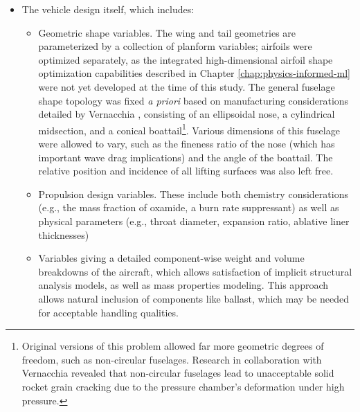 \begin{example}
\begin{itemize}
\begin{itemize}
            \item The vehicle design itself, which includes:
            \begin{itemize}
                \item Geometric shape variables. The wing and tail geometries are parameterized by a collection of planform variables; airfoils were optimized separately, as the integrated high-dimensional airfoil shape optimization capabilities described in Chapter \ref{chap:physics-informed-ml} were not yet developed at the time of this study. The general fuselage shape topology was fixed \emph{a priori} based on manufacturing considerations detailed by Vernacchia \cite{vernacchia_development_2020}, consisting of an ellipsoidal nose, a cylindrical midsection, and a conical boattail\footnote{Original versions of this problem allowed far more geometric degrees of freedom, such as non-circular fuselages. Research in collaboration with Vernacchia \cite{vernacchia_development_2020} revealed that non-circular fuselages lead to unacceptable solid rocket grain cracking due to the pressure chamber's deformation under high pressure.}. Various dimensions of this fuselage were allowed to vary, such as the fineness ratio of the nose (which has important wave drag implications) and the angle of the boattail. The relative position and incidence of all lifting surfaces was also left free.

                \item Propulsion design variables. These include both chemistry considerations (e.g., the mass fraction of oxamide, a burn rate suppressant) as well as physical parameters (e.g., throat diameter, expansion ratio, ablative liner thicknesses)

                \item Variables giving a detailed component-wise weight and volume breakdowns of the aircraft, which allows satisfaction of implicit structural analysis models, as well as mass properties modeling. This approach allows natural inclusion of components like ballast, which may be needed for acceptable handling qualities.

            \end{itemize}
        \end{itemize}


\end{itemize}
\end{example}
